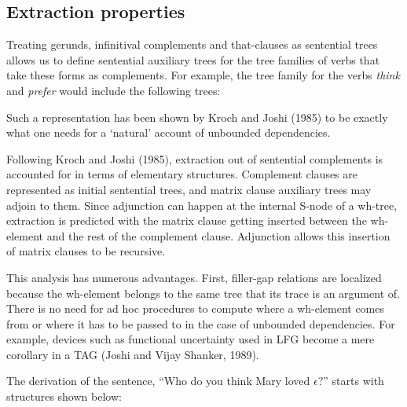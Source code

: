 \subsection{Extraction properties}

Treating gerunds, infinitival complements and that-clauses as sentential
trees allows us to define sentential auxiliary trees for the tree families
 of verbs that take these forms as complements.
For example, the tree family for the verbs {\it think} and  {\it prefer}
 would include the following trees:


\noindent Such a representation has been shown by Kroch and Joshi (1985)\nocite{kj85}  
to be exactly what one needs for a `natural' account of unbounded dependencies.

Following Kroch and Joshi (1985), extraction out of sentential complements is accounted for in terms of 
elementary structures. Complement clauses are represented as initial sentential trees, and matrix clause auxiliary
trees may adjoin to them. Since adjunction can happen at the internal S-node of a wh-tree, extraction is predicted with the 
matrix clause getting inserted between the wh-element and the rest
of the complement clause. Adjunction allows this insertion of matrix clauses to
be recursive. 


This analysis has numerous advantages. First, filler-gap relations are localized because the wh-element 
belongs to the same tree that its trace is an argument of. There is no need for ad hoc procedures to compute
where a wh-element comes from or where it has to be passed to in the case of unbounded dependencies.
 For example, devices such as functional uncertainty used in LFG become a mere corollary in a 
TAG (Joshi and Vijay Shanker, 1989)\nocite{jv89}.

\noindent The derivation of the sentence, 
``Who do you think Mary loved $\epsilon$?''
starts with structures shown below:


